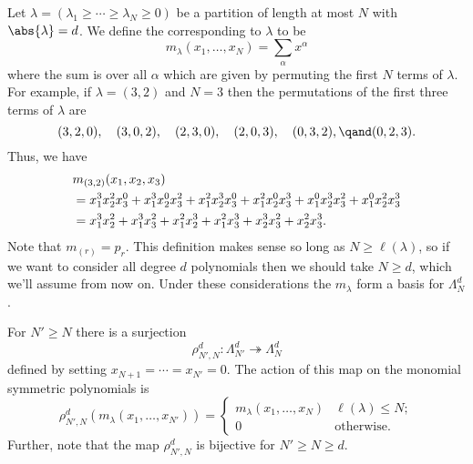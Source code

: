 \documentclass[fleqn]{NotesClass}
\begin{document}
    Let \(\lambda = (\lambda_1 \ge \dotsb \ge \lambda_N \ge 0)\) be a partition of length at most \(N\) with \(\abs{\lambda} = d\).
    We define the  corresponding to \(\lambda\) to be
    \begin{equation}
        m_\lambda(x_1, \dotsc, x_N) = \sum_{\alpha} x^\alpha
    \end{equation}
    where the sum is over all \(\alpha\) which are given by permuting the first \(N\) terms of \(\lambda\).
    For example, if \(\lambda = (3,2)\) and \(N = 3\) then the permutations of the first three terms of \(\lambda\) are
    \begin{equation}
        (3, 2, 0), \quad (3, 0, 2),\quad (2, 3, 0), \quad (2, 0, 3), \quad (0, 3, 2), \qand (0, 2, 3).
    \end{equation}
    Thus, we have
    \begin{align}
        &m_{(3,2)}(x_1, x_2, x_3)\\
        &= x_1^3 x_2^2 x_3^0 + x_1^3 x_2^0 x_3^2 + x_1^2 x_2^3 x_3^0 + x_1^2 x_2^0 x_3^3 + x_1^0 x_2^3 x_3^2 + x_1^0 x_2^2 x_3^3 \notag\\
        &= x_1^3 x_2^2 + x_1^3 x_3^2 + x_1^2 x_2^3 + x_1^2 x_3^3 + x_2^3 x_3^2 + x_2^2 x_3^3. \notag
    \end{align}
    Note that \(m_{(r)} = p_r\).
    This definition makes sense so long as \(N \ge \ell(\lambda)\), so if we want to consider all degree \(d\) polynomials then we should take \(N \ge d\), which we'll assume from now on.
    Under these considerations the \(m_\lambda\) form a basis for \(\Lambda_N^d\).
    
    For \(N' \ge N\) there is a surjection
    \begin{equation}
        \rho_{N',N}^d \colon \Lambda_{N'}^d \twoheadrightarrow \Lambda_N^d
    \end{equation}
    defined by setting \(x_{N+1} = \dotsb = x_{N'} = 0\).
    The action of this map on the monomial symmetric polynomials is
    \begin{equation}
        \rho_{N',N}^d(m_\lambda(x_1, \dotsc, x_{N'})) = 
        \begin{cases}
            m_\lambda(x_1, \dotsc, x_N) & \ell(\lambda) \le N;\\
            0 & \text{otherwise}.
        \end{cases}
    \end{equation}
    Further, note that the map \(\rho_{N',N}^d\) is bijective for \(N' \ge N \ge d\).
    
\end{document}

